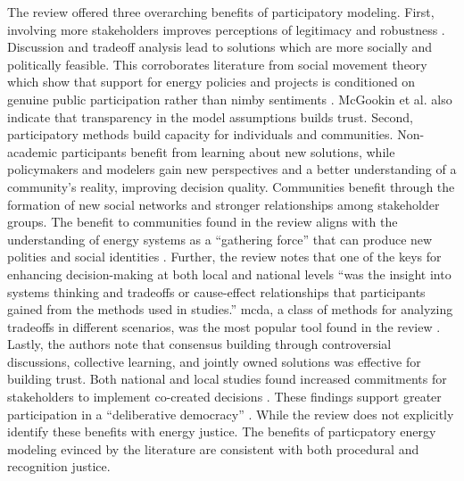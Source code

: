 The review offered three overarching benefits of participatory modeling. First,
involving more stakeholders improves perceptions of legitimacy and robustness
\cite{mcgookin_participatory_2021}. Discussion and tradeoff analysis lead to
solutions which are more socially and politically feasible. This corroborates
literature from social movement theory which show that support for energy
policies and projects is conditioned on genuine public participation rather than
\ac{nimby} sentiments \cite{summers_influencing_2020,ottinger_procedural_2014,
walker_procedural_2017,barragan-contreras_procedural_2022,gonyo_resident_2021,konisky_proximity_2021}.
McGookin et al. also indicate that transparency in the model assumptions builds
trust. Second, participatory methods build capacity for individuals and
communities. Non-academic participants benefit from learning about new
solutions, while policymakers and modelers gain new perspectives and a better
understanding of a community's reality, improving decision quality. Communities
benefit through the formation of new social networks and stronger relationships
among stakeholder groups. The benefit to communities found in the review aligns
with the understanding of energy systems as a ``gathering force'' that can
produce new polities and social identities \cite{bridge_energy_2018}. Further,
the review notes that one of the keys for enhancing decision-making at both
local and national levels ``was the insight into systems thinking and tradeoffs
or cause-effect relationships that participants gained from the methods used in
studies.'' \Ac{mcda}, a class of methods for analyzing tradeoffs in different
scenarios, was the most popular tool found in the review
\cite{mcgookin_participatory_2021}. Lastly, the authors note that consensus
building through controversial discussions, collective learning, and jointly
owned solutions was effective for building trust. Both national and local
studies found increased commitments for stakeholders to implement co-created
decisions \cite{mcgookin_participatory_2021}. These findings support greater
participation in a ``deliberative democracy'' \cite{dryzek_deliberative_2013}.
While the review does not explicitly identify these benefits with energy
justice. The benefits of particpatory energy modeling evinced by the literature
are consistent with both procedural and recognition justice.



